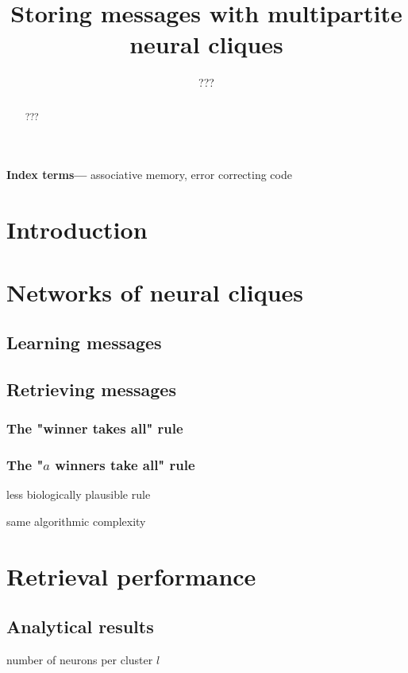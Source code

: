 \documentclass[english,11pt,twocolumn]{article}
\title{Storing messages with multipartite neural cliques}
\author{???}
\date{
	}
\theoremstyle{definition}
\providecommand{\keywords}[1]{\textbf{Index terms---} #1}
\begin{document}
	\maketitle

	 \begin{abstract}
	 ???
	 \end{abstract}
	 
	\keywords{associative memory, error correcting code}
	
	\section{Introduction}
	
	\section{Networks of neural cliques}
		
	\subsection{Learning messages}
	
		\subsection{Retrieving messages}	
	
		\subsubsection{The "winner takes all" rule}	
	
		\subsubsection{The "$a$ winners take all" rule}
		
		less biologically plausible rule
		
		same algorithmic complexity
	

	\section{Retrieval performance}	
	

		\subsection{Analytical results}		
		
		
		
	
	number of neurons per cluster $l$
	
\end{document}
